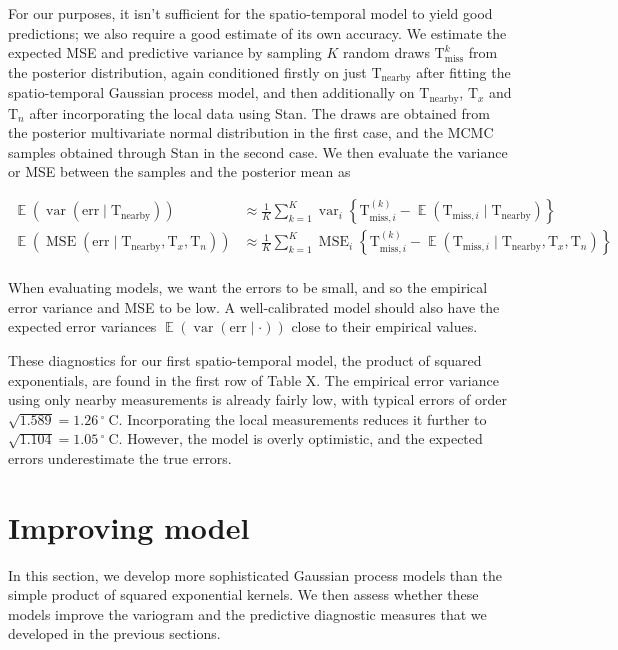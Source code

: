 \documentclass[letter]{article}
\newcommand{\genericdel}[3]{%
      \left#1#3\right#2
    }
\newcommand{\del}[1]{\genericdel(){#1}}
\newcommand{\cbr}[1]{\genericdel\{\}{#1}}
\DeclareMathOperator{\E}{\mathbb{E}}
\DeclareMathOperator{\var}{{var}}
\DeclareMathOperator{\mse}{{MSE}}
\newcommand{\T}{\mathrm{T}}
\newcommand{\Tn}{\T_{n}}
\newcommand{\Tx}{\T_{x}}
\newcommand{\degreeC}{{}^{\circ}~\mathrm{C}}
\newcommand{\miss}{\mathrm{miss}}
\newcommand{\obs}{\mathrm{nearby}}
\newcommand{\error}{\mathrm{err}}
\begin{document}
For our purposes, it isn't sufficient for the spatio-temporal model to yield good predictions; we also require a good estimate of its own accuracy.
We estimate the expected MSE and predictive variance by sampling \(K\) random draws \(\T^k_\miss\) from the posterior distribution, again conditioned firstly on just \(\T_\obs\) after fitting the spatio-temporal Gaussian process model, and then additionally on \(\T_\obs\), \(\Tx\) and \(\Tn\) after incorporating the local data using Stan.
The draws are obtained from the posterior multivariate normal distribution in the first case, and the MCMC samples obtained through Stan in the second case.
We then evaluate the variance or MSE between the samples and the posterior mean as

\begin{equation}
\begin{split}
    \E \del{\var\del{\error \mid \T_\obs}} &\approx \frac{1}{K} \sum_{k=1}^K \var_i \cbr{\T^{(k)}_{\miss,i} - \E\del{\T_{\miss,i} \mid \T_\obs}} \\
    \E \del{\mse\del{\error \mid \T_\obs,\Tx,\Tn}} &\approx \frac{1}{K} \sum_{k=1}^K \mse_i \cbr{\T^{(k)}_{\miss,i} - \E\del{\T_{\miss,i} \mid \T_\obs,\Tx,\Tn}} \\
\end{split}
\end{equation}

When evaluating models, we want the errors to be small, and so the empirical error variance and MSE to be low. A well-calibrated model should also have the expected error variances \(\E \del{\var\del{\error \mid \cdot}}\) close to their empirical values.

These diagnostics for our first spatio-temporal model, the product of squared exponentials, are found in the first row of Table X. The empirical error variance using only nearby measurements is already fairly low, with typical errors of order \(\sqrt{1.589}=1.26\,\degreeC\). Incorporating the local measurements reduces it further to \(\sqrt{1.104}=1.05\,\degreeC\). However, the model is overly optimistic, and the expected errors underestimate the true errors.
    


        \section{Improving model}\label{improving-model}
    

\label{sec:improving_model}
        In this section, we develop more sophisticated Gaussian process models than the simple product of squared exponential kernels. We then assess whether these models improve the variogram and the predictive diagnostic measures that we developed in the previous sections.
\end{document}

